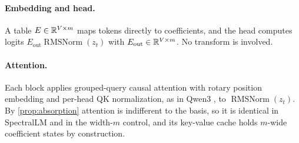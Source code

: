 \paragraph{Embedding and head.} A table $E\in\mathbb{R}^{V\times m}$ maps tokens
directly to coefficients, and the head computes logits $E_{\mathrm{out}}
\operatorname{RMSNorm}(z_t)$ with $E_{\mathrm{out}}\in\mathbb{R}^{V\times m}$. No
transform is involved.

\paragraph{Attention.} Each block applies grouped-query causal attention with
rotary position embedding \citep{su2021roformer} and per-head QK
normalization, as in Qwen3 \citep{qwen3report}, to $\operatorname{RMSNorm}(z_t)$.
By \cref{prop:absorption} attention is indifferent to the basis, so it is
identical in SpectralLM and in the width-$m$ control, and its key-value cache
holds $m$-wide coefficient states by construction.


